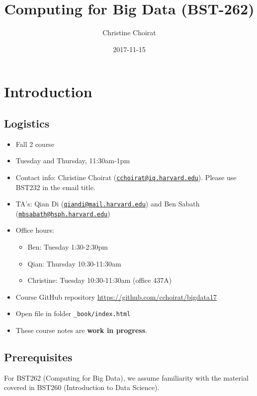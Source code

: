 \documentclass[]{book}
\title{Computing for Big Data (BST-262)}
\author{Christine Choirat}
\date{2017-11-15}
\providecommand{\tightlist}{%
  \setlength{\itemsep}{0pt}\setlength{\parskip}{0pt}}
\theoremstyle{definition}
\theoremstyle{definition}
\theoremstyle{definition}
\theoremstyle{remark}
\begin{document}
\maketitle

{
\setcounter{tocdepth}{1}
\tableofcontents
}
\chapter{Introduction}\label{intro}

\section{Logistics}\label{logistics}

\begin{itemize}
\tightlist
\item
  Fall 2 course
\item
  Tuesday and Thursday, 11:30am-1pm
\item
  Contact info: Christine Choirat
  (\href{mailto:cchoirat@iq.harvard.edu}{\nolinkurl{cchoirat@iq.harvard.edu}}).
  Please use BST232 in the email title.
\item
  TA's: Qian Di
  (\href{mailto:qiandi@mail.harvard.edu}{\nolinkurl{qiandi@mail.harvard.edu}})
  and Ben Sabath
  (\href{mailto:mbsabath@hsph.harvard.edu}{\nolinkurl{mbsabath@hsph.harvard.edu}})
\item
  Office hours:

  \begin{itemize}
  \tightlist
  \item
    Ben: Tuesday 1:30-2:30pm
  \item
    Qian: Thursday 10:30-11:30am
  \item
    Christine: Tuesday 10:30-11:30am (office 437A)
  \end{itemize}
\item
  Course GitHub repository \url{https://github.com/cchoirat/bigdata17}
\item
  Open file in folder \texttt{\_book/index.html}
\item
  These course notes are \textbf{work in progress}.
\end{itemize}

\section{Prerequisites}\label{prerequisites}

For BST262 (Computing for Big Data), we assume familiarity with the
material covered in BST260 (Introduction to Data Science).
\end{document}
